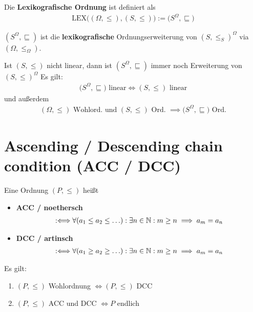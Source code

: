 \begin{definition}
Die \textbf{Lexikografische Ordnung} ist definiert als
\begin{align*}
\text{LEX}\big((\Omega,\leq),(S,\leq)\big):=\big(S^\Omega,\sqsubseteq\big)
\end{align*}
\end{definition}

\begin{bemerkung}
$(S^\Omega,\sqsubseteq)$ ist die \textbf{lexikografische} Ordnungserweiterung von $(S,\leq_S)^\Omega$ via $(\Omega,\leq_\Omega)$.
\end{bemerkung}

Ist $(S,\leq)$ nicht linear, dann ist $(S^\Omega,\sqsubseteq)$ immer noch Erweiterung von $(S,\leq)^\Omega$ Es gilt:
\begin{align*}
\big(S^\Omega,\sqsubseteq\big)\text{ linear}\Longleftrightarrow(S,\leq)\text{ linear}
\end{align*}
und außerdem
\begin{align*}
(\Omega,\leq)\text{ Wohlord. und }(S,\leq)\text{ Ord. }\implies\big(S^\Omega,\sqsubseteq\big)\text{ Ord.}
\end{align*}

\section{Ascending / Descending chain condition (ACC / DCC)}
\begin{definition}
Eine Ordnung $(P,\leq)$ heißt
\begin{itemize}
\item \textbf{ACC / noethersch}
\begin{align*}
:\Longleftrightarrow\forall(a_1\leq a_2\leq\ldots):\exists n\in\mathbb{N}:m\geq n\implies a_m=a_n
\end{align*}
\item \textbf{DCC / artinsch}
\begin{align*}
:\Longleftrightarrow\forall(a_1\geq a_2\geq\ldots):\exists n\in\mathbb{N}:m\geq n\implies a_m=a_n
\end{align*}
\end{itemize}
\end{definition}

\begin{lemma}
Es gilt:
\begin{enumerate}
\item $(P,\leq)$ Wohlordnung $\Longleftrightarrow (P,\leq)$ DCC
\item $(P,\leq)$ ACC und DCC $\Longleftrightarrow P$ endlich
\end{enumerate}
\end{lemma}

